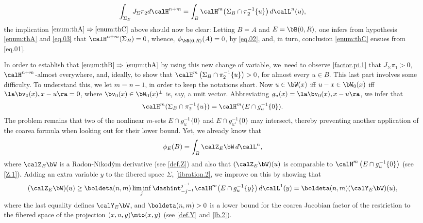\begin{equation}
\label{eq.03}
\int_{\Sigma_B} J_\Sigma \pi_2 d \calH^{n+m} = \int_B \calH^m \bigl(\Sigma_B \cap \pi_2^{-1}\{u\}\bigr)\,d\calL^n(u),
\end{equation}
the implication $\eqref{enum:thA} \Rightarrow \eqref{enum:thC}$ above should now be clear: Letting $B=A$ and $E=\bB(0,R)$, one infers from hypothesis \eqref{enum:thA} and \eqref{eq.03} that $\calH^{n+m}(\Sigma_B) = 0$, whence, $\phi_{\bB(0,R)}(A)=0$, by \eqref{eq.02}, and, in turn, conclusion \eqref{enum:thC} ensues from \eqref{eq.01}.
\par
In order to establish that $\eqref{enum:thB} \Rightarrow \eqref{enum:thA}$ by using this new change of variable, we~need to observe \ref{factor.pi.1} that $J_\Sigma \pi_1 > 0$, $\calH^{n+m}$-almost everywhere, and, ideally, to show that $\calH^m \left(\Sigma_B \cap \pi_2^{-1}\{u\}\right) > 0$, for almost every $u \in B$.
This last part involves some difficulty.
To understand this, we let $m=n-1$, in order to keep the notations short.
Now $u \in \bW(x)$ iff $u-x \in \bW_0(x)$ iff $\la \bv_0(x), x-u \ra =0$, where $\bv_0(x) \in \bW_0(x)^\perp$ is, say, a unit vector.
Abbreviating $g_u(x) = \la \bv_0(x), x-u \ra$, we infer that
\begin{equation*}
\calH^m(\Sigma_B \cap \pi_2^{-1}\{u\}) = \calH^m(E \cap g_u^{-1} \{0\}).
\end{equation*}
The problem remains that two of the nonlinear $m$-sets $E \cap g_u^{-1} \{0\}$ and $E \cap g_{u'}^{-1} \{0\}$ may intersect, thereby preventing another application of the coarea formula when looking out for their lower bound.
Yet, we already know that
\begin{equation*}
\phi_E(B) = \int_B \calZ_E \bW \,d\calL^n,
\end{equation*}
where $\calZ_E \bW$ is a Radon-Nikod\'ym derivative (see \ref{def.Z}) and also that $(\calZ_E \bW)(u)$ is comparable to $\calH^m \left(E \cap g_u^{-1} \{0\}\right)$ (see \ref{Z.1}).
Adding an extra variable $y$ to the fibered space $\Sigma$, \ref{fibration.2}, we improve on this by showing that
\begin{equation*}
(\calZ_E \bW)(u) \geq \boldeta(n,m) \liminf_j \dashint_{-j^{-1}}^{j^{-1}} \calH^m \bigl(E \cap g_u^{-1} \{y\}\bigr) \,d\calL^1(y) = \boldeta(n,m) (\calY_E \bW)(u),
\end{equation*}
where the last equality defines $\calY_E \bW$, and $\boldeta(n,m) > 0$ is a lower bound for the coarea Jacobian factor of the restriction to the fibered space of the projection $(x,u,y) \mto (x,y)$ (see \ref{def.Y} and \ref{lb.2}).
